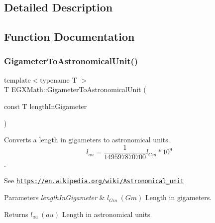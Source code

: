 \subsection{Detailed Description}


\subsection{Function Documentation}
\mbox{\label{group___e_g_x_math-_conversions-_length_conversions-_gigameter-_astronomical_ga048b5af6ec2f33e28435823ffa238d17}} 
\subsubsection{\texorpdfstring{Gigameter\+To\+Astronomical\+Unit()}{GigameterToAstronomicalUnit()}}
{\footnotesize\ttfamily template$<$typename T $>$ \\
T E\+G\+X\+Math\+::\+Gigameter\+To\+Astronomical\+Unit (\begin{DoxyParamCaption}\item[{const T}]{length\+In\+Gigameter }\end{DoxyParamCaption})}



Converts a length in gigameters to astronomical units. \[ l_{au}= \frac{1}{149597870700} l_{Gm} * 10^{9} \]. 

See \href{https://en.wikipedia.org/wiki/Astronomical_unit}{\tt https\+://en.\+wikipedia.\+org/wiki/\+Astronomical\+\_\+unit} 
\begin{DoxyParams}{Parameters}
{\em length\+In\+Gigameter} & $ l_{Gm}\ (Gm)$ Length in gigameters. \\
\hline
\end{DoxyParams}
\begin{DoxyReturn}{Returns}
$ l_{au}\ (au)$ Length in astronomical units. 
\end{DoxyReturn}
\mbox{\label{group___e_g_x_math-_conversions-_length_conversions-_gigameter-_astronomical_ga352bdc453f4bccc2dd188f009c02ff62}} 
